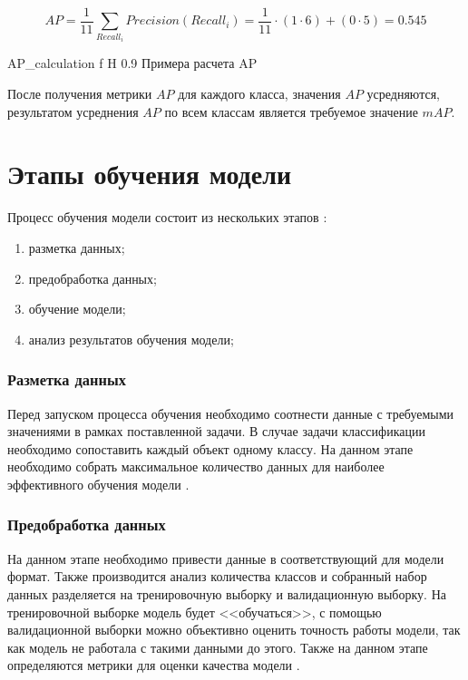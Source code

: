 \begin{equation}
	\label{eq:AP}
	AP = \frac{1}{11}\sum_{Recall_i}Precision(Recall_i) = \frac{1}{11} \cdot (1 \cdot 6) + (0 \cdot 5) = 0.545
\end{equation}


{AP_calculation} %
{f} %
{H} %
{0.9\textwidth} %
{Примера расчета AP} %

После получения метрики $AP$ для каждого класса, значения $AP$ усредняются, результатом усреднения  $AP$ по всем классам является требуемое значение $mAP$.


\section{Этапы обучения модели}
Процесс обучения модели состоит из нескольких этапов \cite{learning}:
\begin{enumerate}
	\item разметка данных;
	\item предобработка данных;
	\item обучение модели;
	\item анализ результатов обучения модели;
\end{enumerate}

\subsubsection{Разметка данных}
Перед запуском процесса обучения необходимо соотнести данные с требуемыми значениями в рамках поставленной задачи. В случае задачи классификации
необходимо сопоставить каждый объект одному классу. На данном этапе необходимо собрать  максимальное количество данных для наиболее эффективного обучения модели \cite{learning}.

\subsubsection{Предобработка данных}
На данном этапе необходимо привести данные в соответствующий для модели формат. Также производится анализ количества классов и собранный набор данных
разделяется на тренировочную выборку и валидационную выборку. На тренировочной выборке модель будет <<обучаться>>, с помощью валидационной выборки 
можно объективно оценить точность работы модели, так как модель не работала с такими данными до этого. Также на данном этапе определяются метрики для оценки качества модели \cite{learning}.

